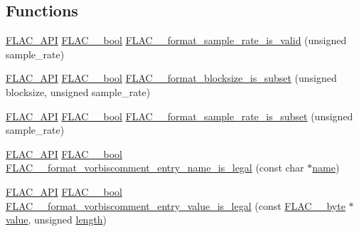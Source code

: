 \subsection*{Functions}
\begin{DoxyCompactItemize}
\item 
\mbox{\hyperlink{group__flac__export_ga56ca07df8a23310707732b1c0007d6f5}{F\+L\+A\+C\+\_\+\+A\+PI}} \mbox{\hyperlink{ordinals_8h_a95103469f1cbd78b8cf250194985b34e}{F\+L\+A\+C\+\_\+\+\_\+bool}} \mbox{\hyperlink{group__flac__format_gaec1c46afe33c0bb200be68bb36e0dd32}{F\+L\+A\+C\+\_\+\+\_\+format\+\_\+sample\+\_\+rate\+\_\+is\+\_\+valid}} (unsigned sample\+\_\+rate)
\item 
\mbox{\hyperlink{group__flac__export_ga56ca07df8a23310707732b1c0007d6f5}{F\+L\+A\+C\+\_\+\+A\+PI}} \mbox{\hyperlink{ordinals_8h_a95103469f1cbd78b8cf250194985b34e}{F\+L\+A\+C\+\_\+\+\_\+bool}} \mbox{\hyperlink{group__flac__format_gacc6258efc7b737f90ee0c32bdb6775ba}{F\+L\+A\+C\+\_\+\+\_\+format\+\_\+blocksize\+\_\+is\+\_\+subset}} (unsigned blocksize, unsigned sample\+\_\+rate)
\item 
\mbox{\hyperlink{group__flac__export_ga56ca07df8a23310707732b1c0007d6f5}{F\+L\+A\+C\+\_\+\+A\+PI}} \mbox{\hyperlink{ordinals_8h_a95103469f1cbd78b8cf250194985b34e}{F\+L\+A\+C\+\_\+\+\_\+bool}} \mbox{\hyperlink{group__flac__format_ga996f8732a2502ad79a68bb4a9f945235}{F\+L\+A\+C\+\_\+\+\_\+format\+\_\+sample\+\_\+rate\+\_\+is\+\_\+subset}} (unsigned sample\+\_\+rate)
\item 
\mbox{\hyperlink{group__flac__export_ga56ca07df8a23310707732b1c0007d6f5}{F\+L\+A\+C\+\_\+\+A\+PI}} \mbox{\hyperlink{ordinals_8h_a95103469f1cbd78b8cf250194985b34e}{F\+L\+A\+C\+\_\+\+\_\+bool}} \mbox{\hyperlink{group__flac__format_ga14980d2e4b0ff2cdd4f22fcf8e75b54c}{F\+L\+A\+C\+\_\+\+\_\+format\+\_\+vorbiscomment\+\_\+entry\+\_\+name\+\_\+is\+\_\+legal}} (const char $\ast$\mbox{\hyperlink{_s_d_l__opengl__glext_8h_aaced7cfc21e7d37775d6921bb8177239}{name}})
\item 
\mbox{\hyperlink{group__flac__export_ga56ca07df8a23310707732b1c0007d6f5}{F\+L\+A\+C\+\_\+\+A\+PI}} \mbox{\hyperlink{ordinals_8h_a95103469f1cbd78b8cf250194985b34e}{F\+L\+A\+C\+\_\+\+\_\+bool}} \mbox{\hyperlink{group__flac__format_gae0707c9d46b2af02f1e145bdae331605}{F\+L\+A\+C\+\_\+\+\_\+format\+\_\+vorbiscomment\+\_\+entry\+\_\+value\+\_\+is\+\_\+legal}} (const \mbox{\hyperlink{ordinals_8h_a5eb569b12d5b047cdacada4d57924ee3}{F\+L\+A\+C\+\_\+\+\_\+byte}} $\ast$\mbox{\hyperlink{_s_d_l__opengl__glext_8h_a8ad81492d410ff2ac11f754f4042150f}{value}}, unsigned \mbox{\hyperlink{_s_d_l__opengl__glext_8h_ab9c919755bde3b34349e23a32b4e0fa7}{length}})

\end{DoxyCompactItemize}

